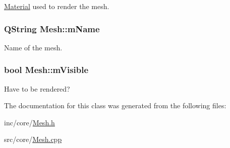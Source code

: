 \hyperlink{class_material}{Material} used to render the mesh. 

\hypertarget{class_mesh_a2f9f4c1fafc88522f10740fccc1856d8}{
\subsubsection[{m\+Name}]{\setlength{\rightskip}{0pt plus 5cm}Q\+String Mesh\+::m\+Name\hspace{0.3cm}{\ttfamily [private]}}}\label{class_mesh_a2f9f4c1fafc88522f10740fccc1856d8}


Name of the mesh. 

\hypertarget{class_mesh_a44b5e53f131fa3af673534cb45b6cf6e}{
\subsubsection[{m\+Visible}]{\setlength{\rightskip}{0pt plus 5cm}bool Mesh\+::m\+Visible\hspace{0.3cm}{\ttfamily [private]}}}\label{class_mesh_a44b5e53f131fa3af673534cb45b6cf6e}


Have to be rendered? 



The documentation for this class was generated from the following files\+:\begin{DoxyCompactItemize}
\item 
inc/core/\hyperlink{_mesh_8h}{Mesh.\+h}\item 
src/core/\hyperlink{_mesh_8cpp}{Mesh.\+cpp}\end{DoxyCompactItemize}
